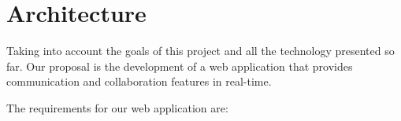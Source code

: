 \chapter{Architecture}
\label{chapter:architecture}




Taking into account the goals of this project and all the technology presented so far. Our proposal is the development of a web application that provides communication and collaboration features in real-time.

The requirements for our web application are:

